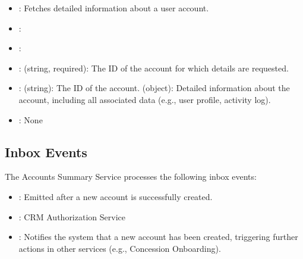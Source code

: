 \documentclass[letterpaper,10pt,english]{sphinxmanual}
\begin{document}
\sphinxAtStartPar
{}
\begin{itemize}
\item {} 
\sphinxAtStartPar
{}: Fetches detailed information about a user account.

\item {} 
\sphinxAtStartPar
{}: 

\item {} 
\sphinxAtStartPar
{}: 

\item {} 
\sphinxAtStartPar
{}:
\sphinxhyphen{}  (string, required): The ID of the account for which details are requested.

\item {} 
\sphinxAtStartPar
{}:
\sphinxhyphen{}  (string): The ID of the account.
\sphinxhyphen{}  (object): Detailed information about the account, including all associated data (e.g., user profile, activity log).

\item {} 
\sphinxAtStartPar
{}: None

\end{itemize}


\subsection{Inbox Events}
\label{\detokenize{crm_system/accounts_summary_service:inbox-events}}
\sphinxAtStartPar
The Accounts Summary Service processes the following inbox events:

\sphinxAtStartPar
{}
\begin{itemize}
\item {} 
\sphinxAtStartPar
{}: Emitted after a new account is successfully created.

\item {} 
\sphinxAtStartPar
{}: CRM Authorization Service

\item {} 
\sphinxAtStartPar
{}: Notifies the system that a new account has been created, triggering further actions in other services (e.g., Concession Onboarding).

\end{itemize}
\end{document}
